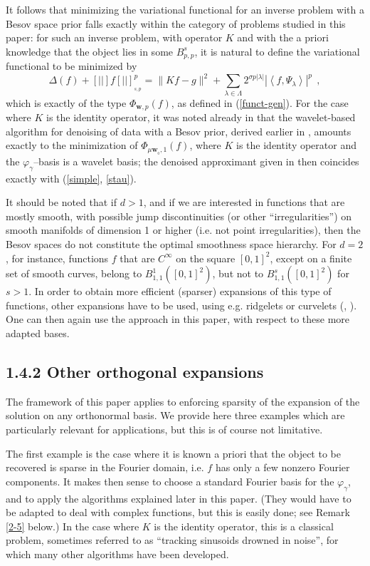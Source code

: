 \documentclass[10pt]{article}
\def\vpg{\varphi_{\gamma}}
\newcommand\eref[1]{(\ref{#1})}
\def\VVert{[\!|\!|\!]}
\begin{document}
It follows that minimizing
the variational functional for an inverse
problem with a Besov space prior falls exactly within the category of
problems studied in this paper: for such an inverse problem,
with operator $K$ and with
the a priori knowledge that the object lies in some $B^s_{p,p}$, it
is natural to define the
variational functional to be minimized
by
$$
\Delta(f)+ \VVert f \VVert _{ _{s,p}}^p = \|Kf-g\|^2 + \sum_{\lambda \in
\Lambda}
2^{\sigma p |\lambda|} |\left< f, \Psi_{\lambda} \right> |^p ~~,
$$
which is exactly of the type
$\Phi_{\mathbf{w},p}(f)$, as defined in \eref{funct-gen}.
For the case where $K$ is the identity operator, it was
noted already in \cite{Cha98}
that the wavelet-based algorithm for denoising
of data with a Besov prior, derived earlier in \cite{Don94},
amounts exactly to the minimization of
$\Phi_{\mu\mathbf{w}_{ _0},1}(f)$, where
$K$ is the identity operator and the $\vpg$--basis is a wavelet basis; the
denoised approximant given in \cite{Don94} then coincides
exactly with (\ref{simple}, \ref{stau}).

It should be noted that if $d > 1$, and if we are interested in functions that
are mostly smooth, with possible jump discontinuities
(or other ``irregularities'')
on smooth manifolds of dimension 1 or higher (i.e. not point irregularities),
then the Besov spaces do not constitute the optimal smoothness
space hierarchy. For
$d=2$, for instance, functions $f$ that are $C^{\infty}$ on the
square $[0,1]^2$, except on a finite set of smooth curves, belong to
$B^1_{1,1}([0,1]^2)$, but not to $B^s_{1,1}([0,1]^2)$ for $s>1$.
In order to obtain
more efficient (sparser) expansions of this type of functions, other expansions
have to be used, using e.g. ridgelets or curvelets (\cite{Don00},
\cite{Can00}).
One can then again use the approach in this paper, with respect to these
more adapted bases.


\subsection*{1.4.2 Other orthogonal expansions}

The framework of this paper applies to enforcing sparsity of the expansion of
the solution on any orthonormal basis. We provide here three examples which are
particularly relevant for applications, but this is of course not limitative.

The first example is the case where it is known a priori
that the object to be recovered is sparse in the Fourier domain, i.e. $f$
has only
a few nonzero Fourier components. It makes then sense to choose a standard
 Fourier
basis for the $\vpg$, and to apply the algorithms explained later in this
paper.
(They would have to be adapted to deal with complex functions, but
this is easily done; see Remark \ref{2-5} below.)
In the case where $K$ is the identity operator,
this is a classical problem, sometimes referred to as ``tracking sinusoids
drowned
in noise'', for which many other algorithms have been
developed.
\end{document}

